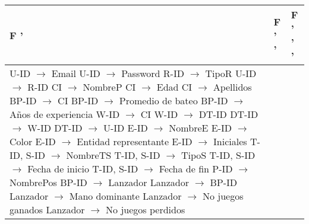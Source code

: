 \documentclass{report}
\begin{document}
    \begin{tabularx}{\textwidth}{|X|X|X|}
        \toprule
        \hfil F ' & \hfil F ' '  & \hfil F ' ' '  \\
        \midrule
        U-ID $\rightarrow$ Email \newline 
        U-ID $\rightarrow$ Password \newline 
        R-ID $\rightarrow$ TipoR \newline 
        U-ID $\rightarrow$ R-ID \newline 
        CI $\rightarrow$ NombreP \newline 
        CI $\rightarrow$ Edad \newline 
        CI $\rightarrow$ Apellidos \newline 
        BP-ID $\rightarrow$ CI \newline 
        BP-ID $\rightarrow$ Promedio de bateo \newline 
        BP-ID $\rightarrow$ Años de experiencia \newline 
        W-ID $\rightarrow$ CI \newline 
        W-ID $\rightarrow$ DT-ID \newline 
        DT-ID $\rightarrow$ W-ID \newline 
        DT-ID $\rightarrow$ U-ID \newline 
        E-ID $\rightarrow$ NombreE \newline 
        E-ID $\rightarrow$ Color \newline 
        E-ID $\rightarrow$ Entidad representante \newline 
        E-ID $\rightarrow$ Iniciales \newline 
        T-ID, S-ID $\rightarrow$ NombreTS \newline 
        T-ID, S-ID $\rightarrow$ TipoS \newline 
        T-ID, S-ID $\rightarrow$ Fecha de inicio \newline 
        T-ID, S-ID $\rightarrow$ Fecha de fin \newline 
        P-ID $\rightarrow$ NombrePos \newline 
        BP-ID $\rightarrow$ Lanzador \newline 
        Lanzador $\rightarrow$ BP-ID \newline 
        Lanzador $\rightarrow$ Mano dominante \newline 
        Lanzador $\rightarrow$ No juegos ganados \newline 
        Lanzador $\rightarrow$ No juegos perdidos \newline 

\end{tabularx}
\end{document}
